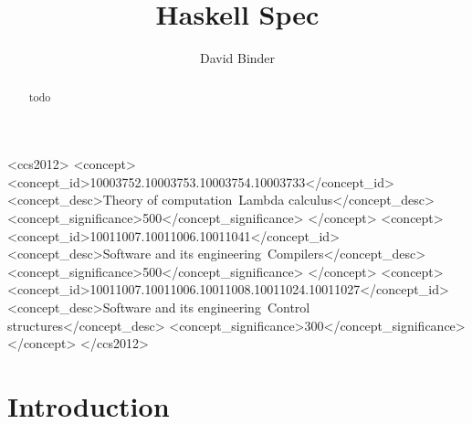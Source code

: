 \documentclass[acmsmall, screen, review, anonymous]{acmart}
\begin{document}
\title{Haskell Spec}



\begin{CCSXML}
  <ccs2012>
     <concept>
         <concept_id>10003752.10003753.10003754.10003733</concept_id>
         <concept_desc>Theory of computation~Lambda calculus</concept_desc>
         <concept_significance>500</concept_significance>
         </concept>
     <concept>
         <concept_id>10011007.10011006.10011041</concept_id>
         <concept_desc>Software and its engineering~Compilers</concept_desc>
         <concept_significance>500</concept_significance>
         </concept>
     <concept>
         <concept_id>10011007.10011006.10011008.10011024.10011027</concept_id>
         <concept_desc>Software and its engineering~Control structures</concept_desc>
         <concept_significance>300</concept_significance>
         </concept>
   </ccs2012>
\end{CCSXML}


\author{David Binder}



\begin{abstract}
  todo
\end{abstract}

\maketitle


\section{Introduction}
\label{sec:introduction}



\end{document}
